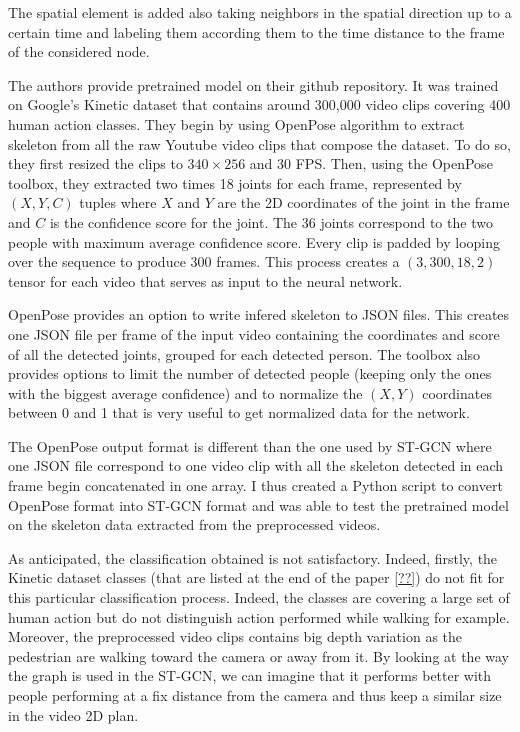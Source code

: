 \documentclass[12pt,a4paper,twoside]{article}
\begin{document}
The spatial element is added also taking neighbors in the spatial direction up to a certain time and labeling them according them to the time distance to the frame of the considered node.

The authors provide pretrained model on their github repository. It was trained on Google's Kinetic dataset that contains around 300,000 video clips covering 400 human action classes. They begin by using OpenPose algorithm to extract skeleton from all the raw Youtube video clips that compose the dataset. To do so, they first resized the clips to $340 \times 256$ and $30$ FPS. Then, using the OpenPose toolbox, they extracted two times 18 joints for each frame, represented by $(X,Y,C)$ tuples where $X$ and $Y$ are the 2D coordinates of the joint in the frame and $C$ is the confidence score for the joint. The 36 joints correspond to the two people with maximum average confidence score. Every clip is padded by looping over the sequence to produce 300 frames. This process creates a $(3, 300, 18, 2)$ tensor for each video that serves as input to the neural network. 

OpenPose provides an option to write infered skeleton to JSON files. This creates one JSON file per frame of the input video containing the coordinates and score of all the detected joints, grouped for each detected person. The toolbox also provides options to limit the number of detected people (keeping only the ones with the biggest average confidence) and to normalize the $(X,Y)$ coordinates between 0 and 1 that is very useful to get normalized data for the network.

The OpenPose output format is different than the one used by ST-GCN where one JSON file correspond to one video clip with all the skeleton detected in each frame begin concatenated in one array. I thus created a Python script to convert OpenPose format into ST-GCN format and was able to test the pretrained model on the skeleton data extracted from the preprocessed videos.

As anticipated, the classification obtained is not satisfactory. Indeed, firstly, the Kinetic dataset classes (that are listed at the end of the paper \ref{??}) do not fit for this particular classification process. Indeed, the classes are covering a large set of human action but do not distinguish action performed while walking for example. Moreover, the preprocessed video clips contains big depth variation as the pedestrian are walking toward the camera or away from it. By looking at the way the graph is used in the ST-GCN, we can imagine that it performs better with people performing at a fix distance from the camera and thus keep a similar size in the video 2D plan. 
\end{document}
